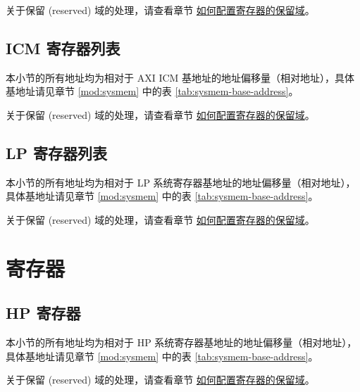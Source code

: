 \documentclass[main\_\_CN.tex]{subfiles}
\begin{document}
关于保留 (reserved) 域的处理，请查看章节 \hyperref[programming-reserved-field]{如何配置寄存器的保留域}。




\subsection{ICM 寄存器列表}

本小节的所有地址均为相对于 AXI ICM 基地址的地址偏移量（相对地址），具体基地址请见章节 \ref{mod:sysmem} \textit{} 中的表 \ref{tab:sysmem-base-address}。

关于保留 (reserved) 域的处理，请查看章节 \hyperref[programming-reserved-field]{如何配置寄存器的保留域}。



\subsection{LP 寄存器列表}

本小节的所有地址均为相对于 LP 系统寄存器基地址的地址偏移量（相对地址），具体基地址请见章节 \ref{mod:sysmem} \textit{} 中的表 \ref{tab:sysmem-base-address}。

关于保留 (reserved) 域的处理，请查看章节 \hyperref[programming-reserved-field]{如何配置寄存器的保留域}。






\newpage
\section{寄存器}

\subsection{HP 寄存器}

本小节的所有地址均为相对于 HP 系统寄存器基地址的地址偏移量（相对地址），具体基地址请见章节 \ref{mod:sysmem} \textit{} 中的表 \ref{tab:sysmem-base-address}。

关于保留 (reserved) 域的处理，请查看章节 \hyperref[programming-reserved-field]{如何配置寄存器的保留域}。
\end{document}
